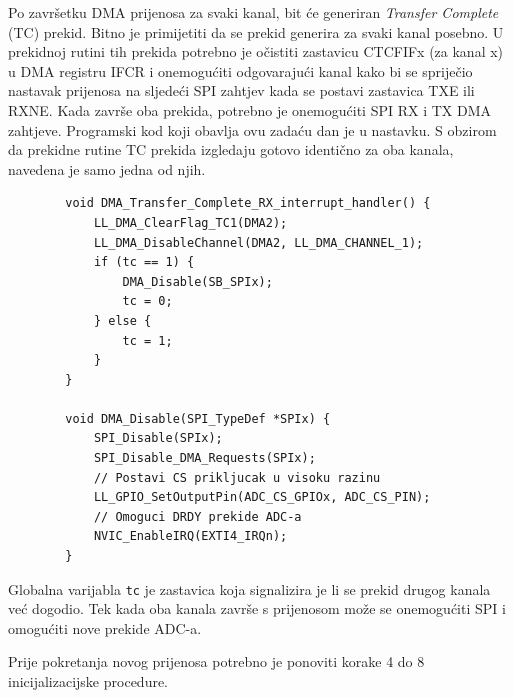 		Po završetku DMA prijenosa za svaki kanal, bit će generiran \textit{Transfer Complete} (TC) prekid. Bitno je primijetiti da se prekid generira za svaki kanal posebno. U prekidnoj rutini tih prekida potrebno je očistiti zastavicu CTCFIFx (za kanal x) u DMA registru IFCR i onemogućiti odgovarajući kanal kako bi se spriječio nastavak prijenosa na sljedeći SPI zahtjev kada se postavi zastavica TXE ili RXNE. Kada završe oba prekida, potrebno je onemogućiti SPI RX i TX DMA zahtjeve. Programski kod koji obavlja ovu zadaću dan je u nastavku. S obzirom da prekidne rutine TC prekida izgledaju gotovo identično za oba kanala, navedena je samo jedna od njih.

		\begin{lstlisting}
		void DMA_Transfer_Complete_RX_interrupt_handler() {
			LL_DMA_ClearFlag_TC1(DMA2);
			LL_DMA_DisableChannel(DMA2, LL_DMA_CHANNEL_1);
			if (tc == 1) {
				DMA_Disable(SB_SPIx);
				tc = 0;
			} else {
				tc = 1;
			}
		}

		void DMA_Disable(SPI_TypeDef *SPIx) {
			SPI_Disable(SPIx);
			SPI_Disable_DMA_Requests(SPIx);
			// Postavi CS prikljucak u visoku razinu
			LL_GPIO_SetOutputPin(ADC_CS_GPIOx, ADC_CS_PIN);
			// Omoguci DRDY prekide ADC-a
			NVIC_EnableIRQ(EXTI4_IRQn);
		}
		\end{lstlisting}
		
		Globalna varijabla \texttt{tc} je zastavica koja signalizira je li se prekid drugog kanala već dogodio. Tek kada oba kanala završe s prijenosom može se onemogućiti SPI i omogućiti nove prekide ADC-a.
		
		Prije pokretanja novog prijenosa potrebno je ponoviti korake 4 do 8 inicijalizacijske procedure.
		
		